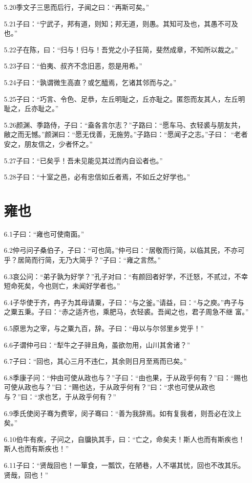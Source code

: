 \documentclass[a4paper,12pt,UTF8,twoside]{ctexbook}
\begin{document}
5.20季文子三思而后行，子闻之曰：“再斯可矣。”

5.21子曰：“宁武子，邦有道，则知；邦无道，则愚。其知可及也，其愚不可及也。”

5.22子在陈，曰：“归与！归与！吾党之小子狂简，斐然成章，不知所以裁之。”

5.23子曰：“伯夷、叔齐不念旧恶，怨是用希。”

5.24子曰：“孰谓微生高直？或乞醯焉，乞诸其邻而与之。”

5.25子曰：“巧言、令色、足恭，左丘明耻之，丘亦耻之。匿怨而友其人，左丘明耻之，丘亦耻之。”

5.26颜渊、季路侍，子曰：“盍各言尔志？”子路曰：“愿车马、衣轻裘与朋友共，敝之而无憾。”颜渊曰：“愿无伐善，无施劳。”子路曰：“愿闻子之志。”子曰：
“老者安之，朋友信之，少者怀之。”

5.27子曰：“已矣乎！吾未见能见其过而内自讼者也。”

5.28子曰：“十室之邑，必有忠信如丘者焉，不如丘之好学也。”


\chapter{雍也}
6.1子曰：“雍也可使南面。”

6.2仲弓问子桑伯子，子曰：“可也简。”仲弓曰：“居敬而行简，以临其民，不亦可乎？居简而行简，无乃大简乎？”子曰：“雍之言然。”

6.3哀公问：“弟子孰为好学？”孔子对曰：“有颜回者好学，不迁怒，不贰过，不幸短命死矣，今也则亡，未闻好学者也。”

6.4子华使于齐，冉子为其母请粟，子曰：“与之釜。”请益，曰：“与之庾。”冉子与之粟五秉。子曰：“赤之适齐也，乘肥马，衣轻裘。吾闻之也，君子周急不继
富。”

6.5原思为之宰，与之粟九百，辞。子曰：“毋以与尔邻里乡党乎！”

6.6子谓仲弓曰：“犁牛之子骍且角，虽欲勿用，山川其舍诸？”

6.7子曰：“回也，其心三月不违仁，其余则日月至焉而已矣。”

6.8季康子问：“仲由可使从政也与？”子曰：“由也果，于从政乎何有？”曰：“赐也可使从政也与？”曰：“赐也达，于从政乎何有？”曰：“求也可使从政也与？”曰：“求也艺，于从政乎何有？”

6.9季氏使闵子骞为费宰，闵子骞曰：“善为我辞焉。如有复我者，则吾必在汶上矣。”

6.10伯牛有疾，子问之，自牖执其手，曰：“亡之，命矣夫！斯人也而有斯疾也！斯人也而有斯疾也！”

6.11子曰：“贤哉回也！一箪食，一瓢饮，在陋巷，人不堪其忧，回也不改其乐。贤哉，回也！”
\end{document}
